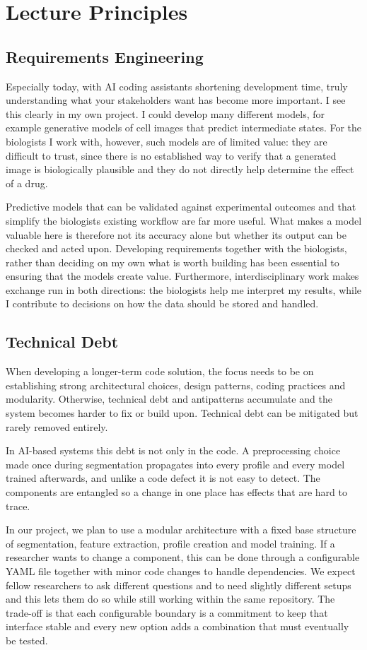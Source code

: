 \documentclass{article}
\begin{document}
\section{Lecture Principles}
\subsection{Requirements Engineering}
Especially today, with AI coding assistants shortening development time, truly understanding what your stakeholders want has become more important. I see this clearly in my own project. I could develop many different models, for example generative models of cell images that predict intermediate states. For the biologists I work with, however, such models are of limited value: they are difficult to trust, since there is no established way to verify that a generated image is biologically plausible and they do not directly help determine the effect of a drug.

Predictive models that can be validated against experimental outcomes and that simplify the biologists existing workflow are far more useful. What makes a model valuable here is therefore not its accuracy alone but whether its output can be checked and acted upon. Developing requirements together with the biologists, rather than deciding on my own what is worth building has been essential to ensuring that the models create value. Furthermore, interdisciplinary work makes exchange run in both directions: the biologists help me interpret my results, while I contribute to decisions on how the data should be stored and handled.

\subsection{Technical Debt}
When developing a longer-term code solution, the focus needs to be on establishing strong architectural choices, design patterns, coding practices and modularity. Otherwise, technical debt and antipatterns accumulate and the system becomes harder to fix or build upon. Technical debt can be mitigated but rarely removed entirely.

In AI-based systems this debt is not only in the code. A preprocessing choice made once during segmentation propagates into every profile and every model trained afterwards, and unlike a code defect it is not easy to detect. The components are entangled so a change in one place has effects that are hard to trace.

In our project, we plan to use a modular architecture with a fixed base structure of segmentation, feature extraction, profile creation and model training. If a researcher wants to change a component, this can be done through a configurable YAML file together with minor code changes to handle dependencies. We expect fellow researchers to ask different questions and to need slightly different setups and this lets them do so while still working within the same repository. The trade-off is that each configurable boundary is a commitment to keep that interface stable and every new option adds a combination that must eventually be tested.
\end{document}
